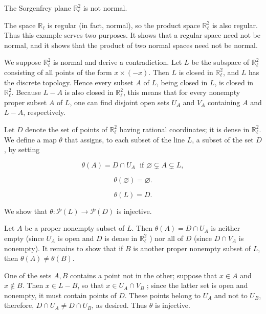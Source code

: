 \begin{centeredblock*}
\begin{example}
\label{ex:\thesection.\theexample}
 The Sorgenfrey plane \(\mathbb{R}_{\ell }^{2}\) is not normal.

The space \(\mathbb{R}_{\ell }\) is regular (in fact, normal), so the product space \(\mathbb{R}_{\ell }^{2}\) is also regular. Thus this example serves two purposes. It shows that a regular space need not be normal, and it shows that the product of two normal spaces need not be normal.

We suppose \(\mathbb{R}_{\ell }^{2}\) is normal and derive a contradiction. Let \(L\) be the subspace of \(\mathbb{R}_{\ell }^{2}\) consisting of all points of the form \(x \times ( {-x})\). Then \(L\) is closed in \(\mathbb{R}_{\ell }^{2}\), and \(L\) has the discrete topology. Hence every subset \(A\) of \(L\), being closed in \(L\), is closed in \(\mathbb{R}_{\ell }^{2}\). Because \(L - A\) is also closed in \(\mathbb{R}_{\ell }^{2}\), this means that for every nonempty proper subset \(A\) of \(L\), one can find disjoint open sets \(U_{A}\) and \(V_{A}\) containing \(A\) and \(L - A\), respectively.

Let \(D\) denote the set of points of \(\mathbb{R}_{\ell }^{2}\) having rational coordinates; it is dense in \(\mathbb{R}_{\ell }^{2}\). We define a map \(\theta\) that assigns, to each subset of the line \(L\), a subset of the set \(D\), by setting

\[
\theta ( A) = D \cap {U}_{A}\;\text{ if }\varnothing \subsetneq A \subsetneq L,
\]

\[
\theta ( \varnothing ) = \varnothing \text{.}
\]

\[
\theta ( L) = D\text{.}
\]

We show that \(\theta : \mathcal{P}( L) \rightarrow \mathcal{P}( D)\) is injective.

Let \(A\) be a proper nonempty subset of \(L\). Then \(\theta ( A) = D \cap {U}_{A}\) is neither empty (since \(U_{A}\) is open and \(D\) is dense in \(\mathbb{R}_{\ell }^{2}\) ) nor all of \(D\) (since \(D \cap {V}_{A}\) is nonempty). It remains to show that if \(B\) is another proper nonempty subset of \(L\), then \(\theta ( A) \neq \theta ( B)\).

One of the sets \(A,B\) contains a point not in the other; suppose that \(x \in A\) and \(x \notin B\). Then \(x \in L - B\), so that \(x \in {U}_{A} \cap {V}_{B}\) ; since the latter set is open and nonempty, it must contain points of \(D\). These points belong to \(U_{A}\) and not to \(U_{B}\), therefore, \(D \cap {U}_{A} \neq D \cap {U}_{B}\), as desired. Thus \(\theta\) is injective.


\end{example}
\end{centeredblock*}
